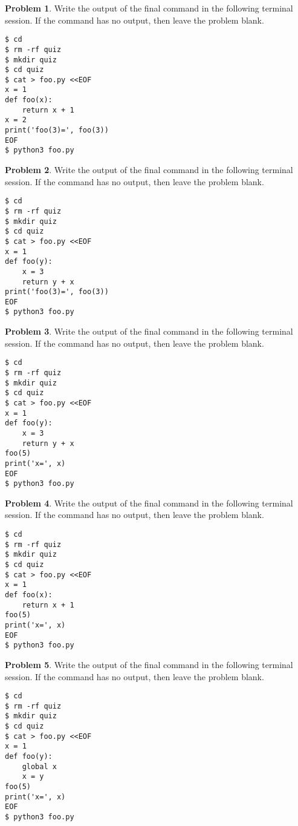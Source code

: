 \documentclass[10pt]{article}
\theoremstyle{definition}
\newtheorem{problem}{Problem}
\begin{document}
\begin{problem}
    Write the output of the final command in the following terminal session.
    If the command has no output, then leave the problem blank.
\end{problem}
\begin{lstlisting}
$ cd
$ rm -rf quiz
$ mkdir quiz
$ cd quiz
$ cat > foo.py <<EOF
x = 1
def foo(x):
    return x + 1
x = 2
print('foo(3)=', foo(3))
EOF
$ python3 foo.py
\end{lstlisting}


\begin{problem}
    Write the output of the final command in the following terminal session.
    If the command has no output, then leave the problem blank.
\end{problem}
\begin{lstlisting}
$ cd
$ rm -rf quiz
$ mkdir quiz
$ cd quiz
$ cat > foo.py <<EOF
x = 1
def foo(y):
    x = 3
    return y + x
print('foo(3)=', foo(3))
EOF
$ python3 foo.py
\end{lstlisting}

\begin{problem}
    Write the output of the final command in the following terminal session.
    If the command has no output, then leave the problem blank.
\end{problem}
\begin{lstlisting}
$ cd
$ rm -rf quiz
$ mkdir quiz
$ cd quiz
$ cat > foo.py <<EOF
x = 1
def foo(y):
    x = 3
    return y + x
foo(5)
print('x=', x)
EOF
$ python3 foo.py
\end{lstlisting}

\begin{problem}
    Write the output of the final command in the following terminal session.
    If the command has no output, then leave the problem blank.
\end{problem}
\begin{lstlisting}
$ cd
$ rm -rf quiz
$ mkdir quiz
$ cd quiz
$ cat > foo.py <<EOF
x = 1
def foo(x):
    return x + 1
foo(5)
print('x=', x)
EOF
$ python3 foo.py
\end{lstlisting}
\vspace{0.4in}


\begin{problem}
    Write the output of the final command in the following terminal session.
    If the command has no output, then leave the problem blank.
\end{problem}
\begin{lstlisting}
$ cd
$ rm -rf quiz
$ mkdir quiz
$ cd quiz
$ cat > foo.py <<EOF
x = 1
def foo(y):
    global x
    x = y
foo(5)
print('x=', x)
EOF
$ python3 foo.py
\end{lstlisting}
\vspace{0.4in}
\end{document}
